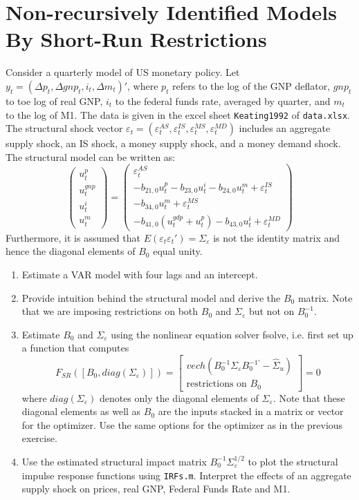 \documentclass[a4paper]{scrartcl}
\begin{document}
\section{Non-recursively Identified Models By Short-Run Restrictions}
Consider a quarterly model of US monetary policy. Let $y_t=(\Delta p_t, \Delta gnp_t, i_t, \Delta m_t)'$, where $p_t$ refers to the log of the GNP deflator, $gnp_t$ to toe log of real GNP, $i_t$ to the federal funds rate, averaged by quarter, and $m_t$ to the log of M1. 
The data is given in the excel sheet \texttt{Keating1992} of \texttt{data.xlsx}. The structural shock vector $\varepsilon_t = (\varepsilon_t^{AS},\varepsilon_t^{IS},\varepsilon_t^{MS},\varepsilon_t^{MD})$ includes an aggregate supply shock, an IS shock, a money supply shock, and a money demand shock. The structural model can be written as:
$$\begin{pmatrix}
u_t^p\\u_t^{gnp}\\u_t^{i}\\u_t^m
\end{pmatrix} = 
\begin{pmatrix}
\varepsilon_{t}^{AS}\\
-b_{21,0}u_t^p - b_{23,0} u_t^i- b_{24,0}u_t^m +\varepsilon_{t}^{IS}\\
-b_{34,0}u_t^m + \varepsilon_{t}^{MS}\\
-b_{41,0}(u_t^{gdp}+u_t^p)-b_{43,0}u_t^i +\varepsilon_{t}^{MD}
\end{pmatrix}$$
Furthermore, it is assumed that $E(\varepsilon_t \varepsilon_t')=\Sigma_\varepsilon$ is not the identity matrix and hence the diagonal elements of $B_0$ equal unity.
\begin{enumerate}
	\item Estimate a VAR model with four lags and an intercept.
	\item Provide intuition behind the structural model and derive the $B_0$ matrix. Note that we are imposing restrictions on both $B_0$ and $\Sigma_\varepsilon$ but not on $B_0^{-1}$.
	\item Estimate $B_0$ and $\Sigma_\varepsilon$ using the nonlinear equation solver fsolve, i.e. first set up a function that computes
	$$ F_{SR}([B_0, diag(\Sigma_\varepsilon)]) = \begin{bmatrix} vech\left(B_0^{-1} \Sigma_\varepsilon B_0^{-1'} - \hat{\Sigma}_u\right)\\\text{restrictions on }B_0\end{bmatrix}=0$$
	where $diag(\Sigma_\varepsilon)$ denotes only the diagonal elements of $\Sigma_\varepsilon$. Note that these diagonal elements as well as $B_0$ are the inputs stacked in a matrix or vector for the optimizer.
	Use the same options for the optimizer as in the previous exercise.
	\item Use the estimated structural impact matrix $B_0^{-1}\Sigma_\varepsilon^{1/2}$ to plot the structural impulse response functions using \texttt{IRFs.m}. Interpret the effects of an aggregate supply shock on prices, real GNP, Federal Funds Rate and M1.
\end{enumerate}
\newpage
\end{document}
